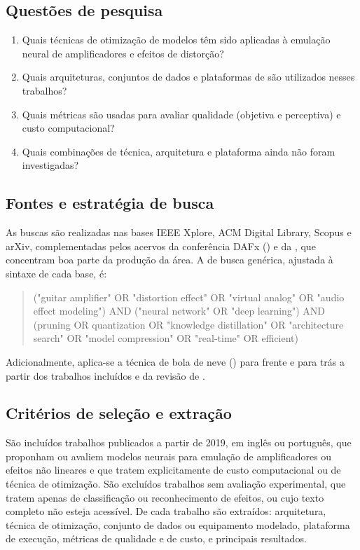 \documentclass[%
  a4paper,%
  12pt,%
  fleqn,%
  english,%
  brazilian,%
]{article}
\begin{document}
\subsection{Questões de pesquisa}%
\label{ssect:qp}

\begin{enumerate}[label = {QP\arabic*:}, leftmargin = *]
\item Quais técnicas de otimização de modelos têm sido aplicadas à emulação neural de amplificadores e efeitos de distorção?
\item Quais arquiteturas, conjuntos de dados e plataformas de  são utilizados nesses trabalhos?
\item Quais métricas são usadas para avaliar qualidade (objetiva e perceptiva) e custo computacional?
\item Quais combinações de técnica, arquitetura e plataforma ainda não foram investigadas?
\end{enumerate}

\subsection{Fontes e estratégia de busca}%
\label{ssect:busca}

As buscas são realizadas nas bases IEEE Xplore, ACM Digital Library, Scopus e arXiv, complementadas pelos acervos da conferência DAFx () e da , que concentram boa parte da produção da área.
A  de busca genérica, ajustada à sintaxe de cada base, é:

\begin{quote}
\small\ttfamily\raggedright
("guitar amplifier" OR "distortion effect" OR "virtual analog" OR "audio effect modeling") AND ("neural network" OR "deep learning") AND (pruning OR quantization OR "knowledge distillation" OR "architecture search" OR "model compression" OR "real-time" OR efficient)
\end{quote}

Adicionalmente, aplica-se a técnica de bola de neve () para frente e para trás a partir dos trabalhos incluídos e da revisão de \textcite{Vanhatalo2022}.

\subsection{Critérios de seleção e extração}%
\label{ssect:criterios}

São incluídos trabalhos publicados a partir de 2019, em inglês ou português, que proponham ou avaliem modelos neurais para emulação de amplificadores ou efeitos não lineares e que tratem explicitamente de custo computacional ou de técnica de otimização.
São excluídos trabalhos sem avaliação experimental, que tratem apenas de classificação ou reconhecimento de efeitos, ou cujo texto completo não esteja acessível.
De cada trabalho são extraídos: arquitetura, técnica de otimização, conjunto de dados ou equipamento modelado, plataforma de execução, métricas de qualidade e de custo, e principais resultados.
\end{document}
